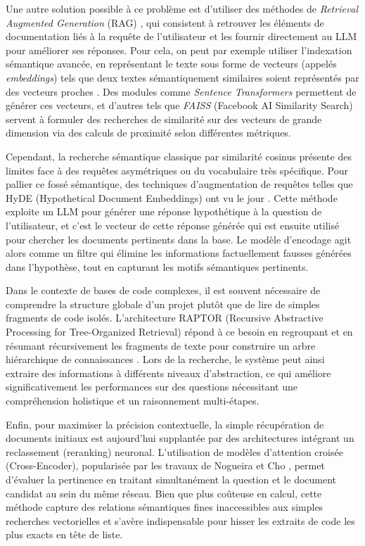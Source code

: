 Une autre solution possible à ce problème est d’utiliser des méthodes de \textit{Retrieval Augmented Generation} (RAG) \cite{Gao2023}, qui consistent à retrouver les éléments de documentation liés à la requête de l’utilisateur et les fournir directement au LLM pour améliorer ses réponses. Pour cela, on peut par exemple utiliser l’indexation sémantique avancée, en représentant le texte sous forme de vecteurs (appelés \textit{embeddings}) tels que deux textes sémantiquement similaires soient représentés par des vecteurs proches \cite{Reimers2019}. Des modules comme \textit{Sentence Transformers} permettent de générer ces vecteurs, et d’autres tels que \textit{FAISS} (Facebook AI Similarity Search) servent à formuler des recherches de similarité sur des vecteurs de grande dimension via des calculs de proximité selon différentes métriques.

Cependant, la recherche sémantique classique par similarité cosinus présente des limites face à des requêtes asymétriques ou du vocabulaire très spécifique. Pour pallier ce fossé sémantique, des techniques d'augmentation de requêtes telles que HyDE (Hypothetical Document Embeddings) ont vu le jour \cite{Gao2022}. Cette méthode exploite un LLM pour générer une réponse hypothétique à la question de l'utilisateur, et c'est le vecteur de cette réponse générée qui est ensuite utilisé pour chercher les documents pertinents dans la base. Le modèle d'encodage agit alors comme un filtre qui élimine les informations factuellement fausses générées dans l'hypothèse, tout en capturant les motifs sémantiques pertinents.

Dans le contexte de bases de code complexes, il est souvent nécessaire de comprendre la structure globale d'un projet plutôt que de lire de simples fragments de code isolés. L'architecture RAPTOR (Recursive Abstractive Processing for Tree-Organized Retrieval) répond à ce besoin en regroupant et en résumant récursivement les fragments de texte pour construire un arbre hiérarchique de connaissances \cite{Sarthi2024}. Lors de la recherche, le système peut ainsi extraire des informations à différents niveaux d'abstraction, ce qui améliore significativement les performances sur des questions nécessitant une compréhension holistique et un raisonnement multi-étapes.

Enfin, pour maximiser la précision contextuelle, la simple récupération de documents initiaux est aujourd'hui supplantée par des architectures intégrant un reclassement (reranking) neuronal. L'utilisation de modèles d'attention croisée (Cross-Encoder), popularisée par les travaux de Nogueira et Cho \cite{Nogueira2019}, permet d'évaluer la pertinence en traitant simultanément la question et le document candidat au sein du même réseau. Bien que plus coûteuse en calcul, cette méthode capture des relations sémantiques fines inaccessibles aux simples recherches vectorielles et s'avère indispensable pour hisser les extraits de code les plus exacts en tête de liste.

